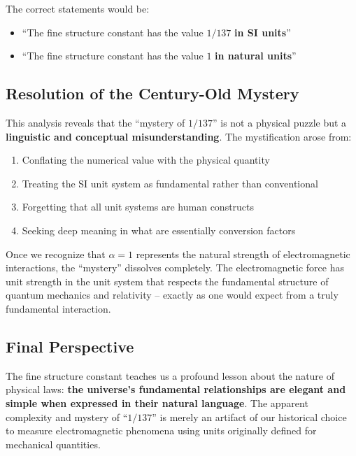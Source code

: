 The correct statements would be:
\begin{itemize}
	\item[\textcolor{green}{$\checkmark$}] ``The fine structure constant has the value $1/137$ \textbf{in SI units}''
	\item[\textcolor{green}{$\checkmark$}] ``The fine structure constant has the value $1$ \textbf{in natural units}''
\end{itemize}

\subsection{Resolution of the Century-Old Mystery}

This analysis reveals that the ``mystery of $1/137$'' is not a physical puzzle but a \textbf{linguistic and conceptual misunderstanding}. The mystification arose from:

\begin{enumerate}
	\item Conflating the numerical value with the physical quantity
	\item Treating the SI unit system as fundamental rather than conventional
	\item Forgetting that all unit systems are human constructs
	\item Seeking deep meaning in what are essentially conversion factors
\end{enumerate}

Once we recognize that $\alpha = 1$ represents the natural strength of electromagnetic interactions, the ``mystery'' dissolves completely. The electromagnetic force has unit strength in the unit system that respects the fundamental structure of quantum mechanics and relativity -- exactly as one would expect from a truly fundamental interaction.

\subsection{Final Perspective}

The fine structure constant teaches us a profound lesson about the nature of physical laws: \textbf{the universe's fundamental relationships are elegant and simple when expressed in their natural language}. The apparent complexity and mystery of ``$1/137$'' is merely an artifact of our historical choice to measure electromagnetic phenomena using units originally defined for mechanical quantities.

